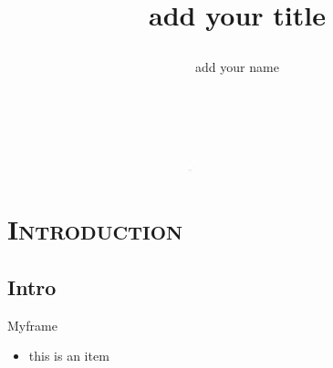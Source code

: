 \documentclass[xcolor=x11names,compress]{beamer}
\begin{document}
{ 
\begin{frame}

\vspace{-1.5cm}
\hfill{}
\begin{flushleft}
\hspace{-1cm}\includegraphics[width=0.8\textwidth, height=0.4em]{title_line.pdf}\hfill

\title{
\begin{flushleft}{\huge \color{BHKpresentationDark} add your title} 
\end{flushleft}}

\date{$~~$}
\author{\begin{flushleft}\vspace{-1cm} add your name\end{flushleft}}
\titlepage
\end{flushleft}
\end{frame}
}


\section{\scshape Introduction}
\subsection{Intro}
\begin{frame}{Myframe}
\begin{itemize}
	\item this is an item
\end{itemize}
\end{frame}
\end{document}
